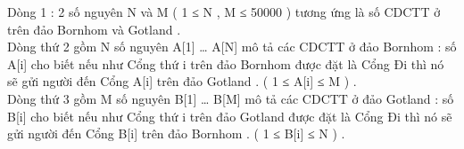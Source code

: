 Dòng 1 : 2 số nguyên N và M ( 1 ≤ N , M ≤ 50000 ) tương ứng là số CDCTT ở trên đảo Bornhom và Gotland .
\\Dòng thứ 2 gồm N số nguyên A[1] … A[N] mô tả các CDCTT ở đảo Bornhom : số A[i] cho biết nếu như Cổng thứ i trên đảo Bornhom được đặt là Cổng Đi thì nó sẽ gửi người đến Cổng A[i] trên đảo Gotland . ( 1 ≤ A[i] ≤ M ) .
\\Dòng thứ 3 gồm M số nguyên B[1] … B[M] mô tả các CDCTT ở đảo Gotland : số B[i] cho biết nếu như Cổng thứ i trên đảo Gotland được đặt là Cổng Đi thì nó sẽ gửi người đến Cổng B[i] trên đảo Bornhom . ( 1 ≤ B[i] ≤ N ) .

\